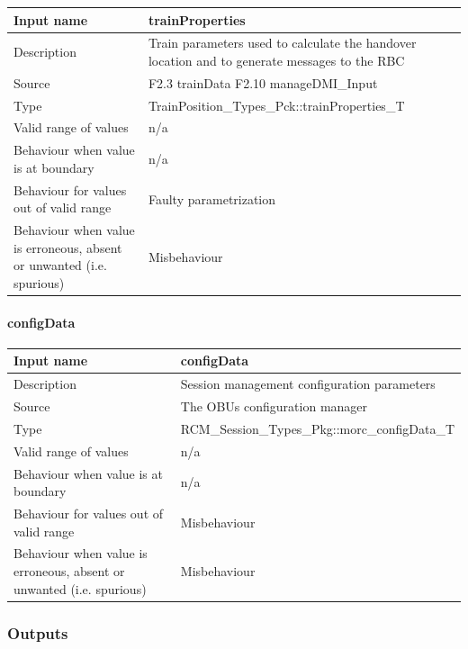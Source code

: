 \begin{longtable}{p{}p{}}
	\toprule
	Input name				& trainProperties \\
	\midrule
	Description				& Train parameters used to calculate the handover location and to generate messages to the RBC \\
	\midrule
	Source					& F2.3 trainData\newline
	F2.10 manageDMI\_Input \\ 
	\midrule
	Type					& TrainPosition\_Types\_Pck::trainProperties\_T \\
	\midrule
	Valid range of values	& n/a \\
	\midrule
	Behaviour when value is at boundary	& n/a \\
	\midrule
	Behaviour for values out of valid range	& Faulty parametrization \\
	\midrule
	Behaviour when value is erroneous, absent or unwanted (i.e. spurious) & Misbehaviour \\
	\bottomrule
\end{longtable}

\paragraph{configData}

\begin{longtable}{p{}p{}}
	\toprule
	Input name				& configData \\
	\midrule
	Description				& Session management configuration parameters \\
	\midrule
	Source					& The OBUs configuration manager \\ 
	\midrule
	Type					& RCM\_Session\_Types\_Pkg::morc\_configData\_T \\
	\midrule
	Valid range of values	& n/a \\
	\midrule
	Behaviour when value is at boundary	& n/a \\
	\midrule
	Behaviour for values out of valid range	& Misbehaviour \\
	\midrule
	Behaviour when value is erroneous, absent or unwanted (i.e. spurious) & Misbehaviour \\
	\bottomrule
\end{longtable}


\subsubsection{Outputs}\label{s:manage_radio_communication_outputs}

